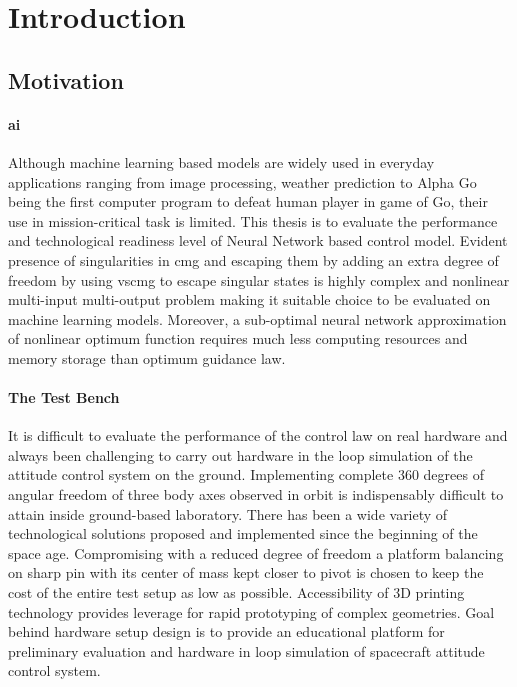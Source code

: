 \chapter{Introduction}
\label{chap:1}
\section{Motivation}


\subsubsection*{\acrfull{ai}}

Although machine learning based models are widely used in everyday applications ranging from image processing, weather prediction to Alpha Go being the first computer program to defeat human player in game of Go, \cite{Silver2016} their use in mission-critical task is limited.  This thesis is to evaluate the performance and technological readiness level of Neural Network based control model. Evident presence of singularities in \acrfull{cmg} and escaping them by adding an extra degree of freedom by using \acrfull{vscmg} to escape singular states is highly complex and nonlinear multi-input multi-output problem making it suitable choice to be evaluated on machine learning models. Moreover, a sub-optimal neural network approximation of nonlinear optimum function requires much less computing resources and memory storage than optimum guidance law\cite{Santoni1996}.

\subsubsection*{The Test Bench}
It is difficult to evaluate the performance of the control law on real hardware and always been challenging to carry out hardware in the loop simulation of the attitude control system on the ground. Implementing complete 360 degrees of angular freedom of three body axes observed in orbit is indispensably difficult to attain inside ground-based laboratory. There has been a wide variety of technological solutions proposed and implemented since the beginning of the space age. Compromising with a reduced degree of freedom a platform balancing on sharp pin with its center of mass kept closer to pivot is chosen to keep the cost of the entire test setup as low as possible. 
Accessibility of 3D printing technology provides leverage for rapid prototyping of complex geometries. Goal behind hardware setup design is to provide an educational platform for preliminary evaluation and hardware in loop simulation of spacecraft attitude control system.

